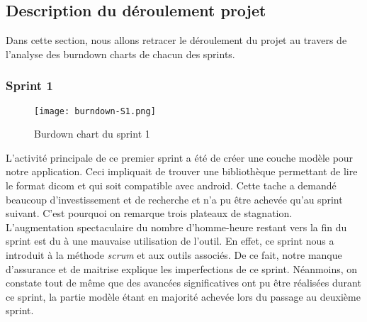 \subsection{Description du déroulement projet}

Dans cette section, nous allons retracer le déroulement du projet au travers de l'analyse des burndown charts de chacun des sprints.

\subsubsection{Sprint 1}

\begin{figure}[h]
\begin{center}
	\texttt{[image: burndown-S1.png]}
\end{center}
	\caption{Burdown chart du sprint 1}
\end{figure}

L'activité principale de ce premier sprint a été de créer une couche modèle pour notre application. Ceci impliquait de trouver une bibliothèque permettant de lire le format dicom et qui soit compatible avec android. Cette tache a demandé beaucoup d'investissement et de recherche et n'a pu être achevée qu'au sprint suivant. C'est pourquoi on remarque trois plateaux de stagnation. L'augmentation spectaculaire du nombre d'homme-heure restant vers la fin du sprint est du à une mauvaise utilisation de l'outil. En effet, ce sprint nous a introduit à la méthode \emph{scrum} et aux outils associés. De ce fait, notre manque d'assurance et de maitrise explique les imperfections de ce sprint. Néanmoins, on constate tout de même que des avancées significatives ont pu être réalisées durant ce sprint, la partie modèle étant en majorité achevée lors du passage au deuxième sprint.